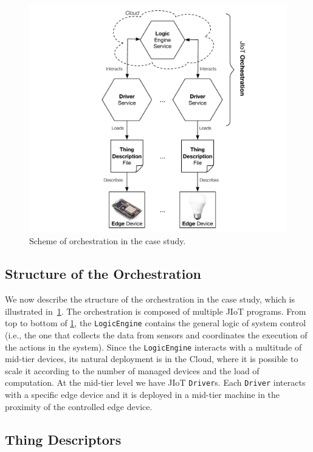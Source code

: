 \begin{figure}[b]
  \centering
  \includegraphics[width=.8\textwidth]{case_study_abstraction.pdf}
  \caption{Scheme of orchestration in the case study.}
  \label{fig:case_study_abstraction}
\end{figure}

\subsection{Structure of the Orchestration}

We now describe the structure of the orchestration in the case study, which is
illustrated in~\cref{fig:case_study_abstraction}.
%
The orchestration is composed of multiple JIoT programs. From top to bottom of
\cref{fig:case_study_abstraction}, the \texttt{LogicEngine}  contains the general
logic of system control (i.e., the one that collects the data from sensors and
coordinates the execution of the actions in the system). Since the
\texttt{LogicEngine} interacts with a multitude of mid-tier devices, its
natural deployment is in the Cloud, where it is possible to scale it according
to the number of managed devices and the load of computation. At the mid-tier
level we have JIoT \texttt{Driver}s. Each \texttt{Driver} interacts with a
specific edge device and it is deployed in a mid-tier machine in the proximity
of the controlled edge device.

\subsection{Thing Descriptors}

